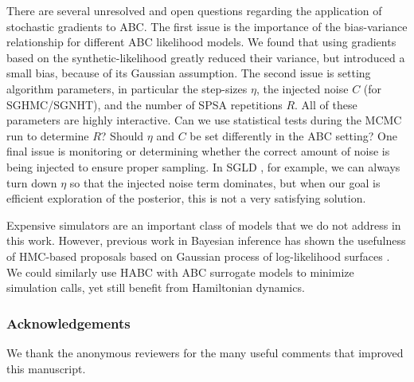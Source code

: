 \documentclass[]{article}
\begin{document}
There are several unresolved and open questions regarding the application of stochastic gradients to ABC.  The first issue is the importance of the bias-variance relationship for different ABC likelihood models.    We found that using gradients based on the synthetic-likelihood greatly reduced their variance, but introduced a small bias, because of its Gaussian assumption.  The second issue is setting algorithm parameters, in particular the step-sizes $\eta$, the injected noise $C$ (for SGHMC/SGNHT), and the number of SPSA repetitions $R$.  All of these parameters are highly interactive.  Can we use statistical tests during the MCMC run to determine $R$?  Should $\eta$ and $C$ be set differently in the ABC setting?  One final issue is monitoring or determining whether the correct amount of noise is being injected to ensure proper sampling.  In SGLD \cite{welling2011bayesian}, for example, we can always turn down $\eta$ so that the injected noise term dominates, but when our goal is efficient exploration of the posterior, this is  not a very satisfying solution.


Expensive simulators are an important class of models that we do not address in this work.  However, previous work in Bayesian inference has shown the usefulness of HMC-based proposals based on Gaussian process of log-likelihood surfaces \cite{rasmussen:2003}.   We could similarly use HABC with  ABC surrogate models \cite{Meeds2014GpsUai,wilkinson:2014} to minimize simulation calls, yet still  benefit from Hamiltonian dynamics.  
\subsubsection*{Acknowledgements}
We thank the anonymous reviewers for the many useful comments that improved this manuscript.  

\clearpage


\end{document}
